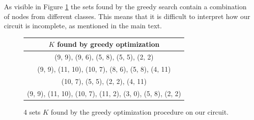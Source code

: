 As visible in Figure \ref{fig:table_complteness} the sets found by the greedy search contain a combination of nodes from different classes. This means that it is difficult to interpret how our circuit is incomplete, as mentioned in the main text. %

\begin{figure}
\centering
\begin{tabular}{ |c| } 
\hline
$K$ found by greedy optimization \\ 
\hline \hline
(9, 9), (9, 6), (5, 8), (5, 5), (2, 2) \\
\hline
(9, 9), (11, 10), (10, 7), (8, 6), (5, 8), (4, 11) \\
\hline
(10, 7), (5, 5), (2, 2), (4, 11)\\
\hline
(9, 9), (11, 10), (10, 7), (11, 2), (3, 0), (5, 8), (2, 2) \\
\hline

\end{tabular}
\caption{4 sets $K$ found by the greedy optimization procedure on our circuit.}
\label{fig:table_complteness}
\end{figure}




